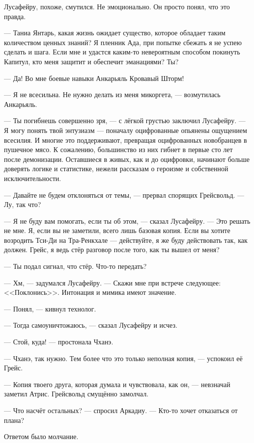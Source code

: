 Лусафейру, похоже, смутился.
Не эмоционально.
Он просто понял, что это правда.

--- Таниа Янтарь, какая жизнь ожидает существо, которое обладает таким количеством ценных знаний?
Я пленник Ада, при попытке сбежать я не успею сделать и шага.
Если мне и удастся каким-то невероятным способом покинуть Капитул, кто меня защитит и обеспечит эманациями?
Ты?

--- Да!
Во мне боевые навыки Анкарьяль Кровавый Шторм!

--- Я не всесильна.
Не нужно делать из меня микоргета, --- возмутилась Анкарьяль.

--- Ты погибнешь совершенно зря, --- с лёгкой грустью заключил Лусафейру.
--- Я могу понять твой энтузиазм --- поначалу оцифрованные опьянены ощущением всесилия.
И многие это поддерживают, превращая оцифрованных новобранцев в пушечное мясо.
К сожалению, большинство из них гибнет в первые сто лет после демонизации.
Оставшиеся в живых, как и до оцифровки, начинают больше доверять логике и статистике, нежели рассказам о героизме и собственной исключительности.

--- Давайте не будем отклоняться от темы, --- прервал спорящих Грейсвольд.
--- Лу, так что?

--- Я не буду вам помогать, если ты об этом, --- сказал Лусафейру.
--- Это решать не мне.
Я, если вы не заметили, всего лишь базовая копия.
Если вы хотите возродить Тси-Ди на Тра-Ренкхале --- действуйте, я же буду действовать так, как должен.
Грейс, я ведь стёр разговор после того, как ты вышел от меня?

--- Ты подал сигнал, что стёр.
Что-то передать?

--- Хм, --- задумался Лусафейру.
--- Скажи мне при встрече следующее: <<Поклонись>>.
Интонация и мимика имеют значение.

--- Понял, --- кивнул технолог.

--- Тогда самоуничтожаюсь, --- сказал Лусафейру и исчез.

--- Стой, куда! --- простонала Чханэ.

--- Чханэ, так нужно.
Тем более что это только неполная копия, --- успокоил её Грейс.

--- Копия твоего друга, которая думала и чувствовала, как он, --- невзначай заметил Атрис.
Грейсвольд смущённо замолчал.

--- Что насчёт остальных? --- спросил Аркадиу.
--- Кто-то хочет отказаться от плана?

Ответом было молчание.

